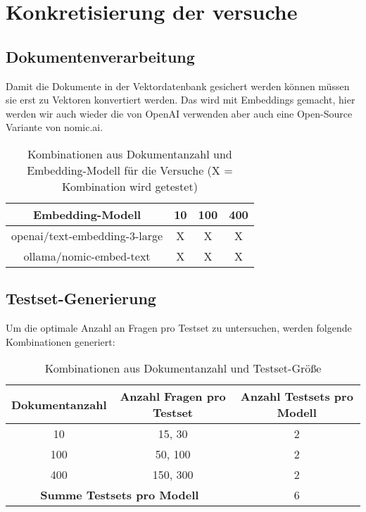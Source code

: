 \section{Konkretisierung der versuche}

\subsection{Dokumentenverarbeitung}

Damit die Dokumente in der Vektordatenbank gesichert werden können müssen sie erst zu Vektoren konvertiert werden. Das wird mit Embeddings gemacht, hier werden wir auch wieder die von OpenAI verwenden aber auch eine Open-Source Variante von nomic.ai.

\begin{table}[htbp]
    \centering
    \begin{tabular}{|c|c|c|c|}
        \hline
        \textbf{Embedding-Modell} & \textbf{10} & \textbf{100} & \textbf{400} \\
        \hline
        openai/text-embedding-3-large & X & X & X \\
        ollama/nomic-embed-text       & X & X & X \\
        \hline
    \end{tabular}
    \caption{Kombinationen aus Dokumentanzahl und Embedding-Modell für die Versuche (X = Kombination wird getestet)}
    \label{tab:dokument-erstellung}
\end{table}

\subsection{Testset-Generierung}

Um die optimale Anzahl an Fragen pro Testset zu untersuchen, werden folgende Kombinationen generiert:

\begin{table}[htbp]
    \centering
    \begin{tabular}{|c|c|c|}
        \hline
        \textbf{Dokumentanzahl} & \textbf{Anzahl Fragen pro Testset} & \textbf{Anzahl Testsets pro Modell} \\
        \hline
        10   & 15, 30    & 2 \\
        100  & 50, 100   & 2 \\
        400 & 150, 300  & 2 \\
        \hline
        \multicolumn{2}{|c|}{\textbf{Summe Testsets pro Modell}} & 6 \\
        \hline
    \end{tabular}
    \caption{Kombinationen aus Dokumentanzahl und Testset-Größe}
\end{table}


